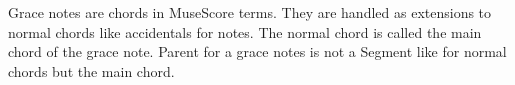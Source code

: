 Grace notes are chords in Muse\+Score terms. They are handled as extensions to normal chords like accidentals for notes. The normal chord is called the main chord of the grace note. Parent for a grace notes is not a Segment like for normal chords but the main chord. 